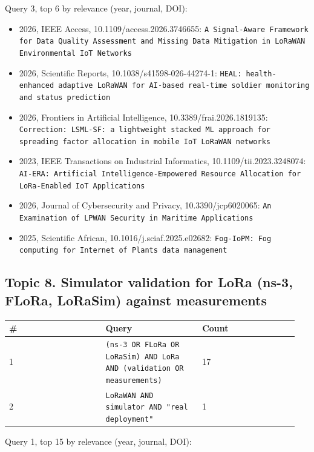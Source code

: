 Query 3, top 6 by relevance (year, journal, DOI):

\begin{itemize}
\item 2026, IEEE Access, 10.1109/access.2026.3746655: \texttt{A Signal-Aware Framework for Data Quality Assessment and Missing Data Mitigation in LoRaWAN Environmental IoT Networks}
\item 2026, Scientific Reports, 10.1038/s41598-026-44274-1: \texttt{HEAL: health-enhanced adaptive LoRaWAN for AI-based real-time soldier monitoring and status prediction}
\item 2026, Frontiers in Artificial Intelligence, 10.3389/frai.2026.1819135: \texttt{Correction: LSML-SF: a lightweight stacked ML approach for spreading factor allocation in mobile IoT LoRaWAN networks}
\item 2023, IEEE Transactions on Industrial Informatics, 10.1109/tii.2023.3248074: \texttt{AI-ERA: Artificial Intelligence-Empowered Resource Allocation for LoRa-Enabled IoT Applications}
\item 2026, Journal of Cybersecurity and Privacy, 10.3390/jcp6020065: \texttt{An Examination of LPWAN Security in Maritime Applications}
\item 2025, Scientific African, 10.1016/j.sciaf.2025.e02682: \texttt{Fog-IoPM: Fog computing for Internet of Plants data management}
\end{itemize}

\subsection*{Topic 8. Simulator validation for LoRa (ns-3, FLoRa, LoRaSim) against measurements}

{\scriptsize\raggedright
\begin{longtable}{p{0.317\linewidth}p{0.317\linewidth}p{0.317\linewidth}}
\toprule
\# & Query & Count \\
\midrule
\endhead
1 & \texttt{(ns-3 OR FLoRa OR LoRaSim) AND LoRa AND (validation OR measurements)} & 17 \\
2 & \texttt{LoRaWAN AND simulator AND "real deployment"} & 1 \\
\bottomrule
\end{longtable}}

Query 1, top 15 by relevance (year, journal, DOI):

